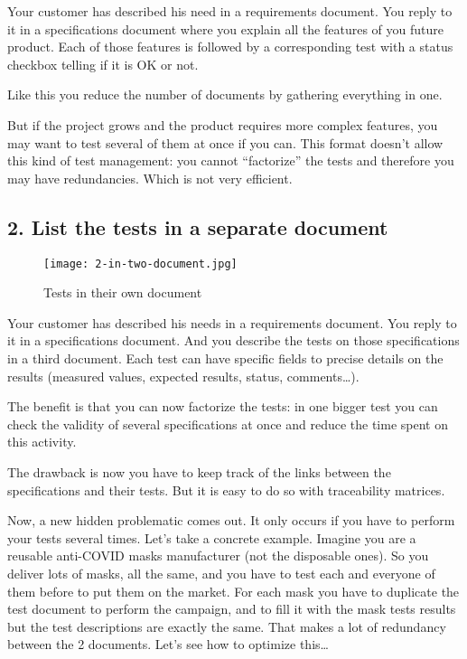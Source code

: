 Your customer has described his need in a requirements document. You reply to it in a specifications document where you explain all the features of you future product. Each of those features is followed by a corresponding test with a status checkbox telling if it is OK or not.

Like this you reduce the number of documents by gathering everything in one.

But if the project grows and the product requires more complex features, you may want to test several of them at once if you can. This format doesn’t allow this kind of test management: you cannot “factorize” the tests and therefore you may have redundancies. Which is not very efficient.

\subsection{2. List the tests in a separate document}

\begin{figure}[h]
    \centering
    \texttt{[image: 2-in-two-document.jpg]}
    \caption{Tests in their own document}
    \label{fig:TwoDocument}
\end{figure}

Your customer has described his needs in a requirements document. You reply to it in a specifications document. And you describe the tests on those specifications in a third document. Each test can have specific fields to precise details on the results (measured values, expected results, status, comments\dots).

The benefit is that you can now factorize the tests: in one bigger test you can check the validity of several specifications at once and reduce the time spent on this activity.

The drawback is now you have to keep track of the links between the specifications and their tests. But it is easy to do so with traceability matrices.

Now, a new hidden problematic comes out. It only occurs if you have to perform your tests several times. Let’s take a concrete example. Imagine you are a reusable anti-COVID masks manufacturer (not the disposable ones). So you deliver lots of masks, all the same, and you have to test each and everyone of them before to put them on the market. For each mask you have to duplicate the test document to perform the campaign, and to fill it with the mask tests results but the test descriptions are exactly the same. That makes a lot of redundancy between the 2 documents. Let’s see how to optimize this…

